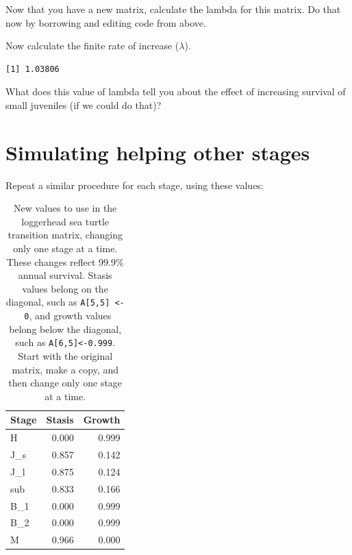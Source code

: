 \documentclass[
  letterpaper,
  DIV=11,
  numbers=noendperiod]{scrreprt}
\newenvironment{Shaded}{\begin{snugshade}}{\end{snugshade}}
\newcommand{\DecValTok}[1]{\textcolor[rgb]{0.68,0.00,0.00}{#1}}
\newcommand{\FunctionTok}[1]{\textcolor[rgb]{0.28,0.35,0.67}{#1}}
\newcommand{\NormalTok}[1]{\textcolor[rgb]{0.00,0.23,0.31}{#1}}
\newcommand{\SpecialCharTok}[1]{\textcolor[rgb]{0.37,0.37,0.37}{#1}}
\begin{document}
Now that you have a new matrix, calculate the lambda for this matrix. Do
that now by borrowing and editing code from above.

Now calculate the finite rate of increase (\(\lambda\)).

\begin{Shaded}
\end{Shaded}

\begin{verbatim}
[1] 1.03806
\end{verbatim}

What does this value of lambda tell you about the effect of increasing
survival of small juveniles (if we could do that)?

\section{Simulating helping other
stages}\label{simulating-helping-other-stages}

Repeat a similar procedure for each stage, using these values:

\begin{longtable}[]{@{}lrr@{}}

\caption{\label{tbl-changes}New values to use in the loggerhead sea
turtle transition matrix, changing only one stage at a time. These
changes reflect 99.9\% annual survival. Stasis values belong on the
diagonal, such as \texttt{A{[}5,5{]}\ \textless{}-\ 0}, and growth
values belong below the diagonal, such as
\texttt{A{[}6,5{]}\textless{}-0.999}. Start with the original matrix,
make a copy, and then change only one stage at a time.}

\tabularnewline

\toprule\noalign{}
Stage & Stasis & Growth \\
\midrule\noalign{}
\endhead
\bottomrule\noalign{}
\endlastfoot
H & 0.000 & 0.999 \\
J\_s & 0.857 & 0.142 \\
J\_l & 0.875 & 0.124 \\
sub & 0.833 & 0.166 \\
B\_1 & 0.000 & 0.999 \\
B\_2 & 0.000 & 0.999 \\
M & 0.966 & 0.000 \\

\end{longtable}
\end{document}
